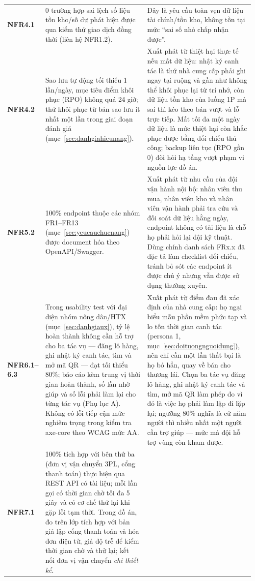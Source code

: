 \begin{longtable}{L{1.67cm} L{6.67cm} L{6.56cm}}
\textbf{NFR4.1} &
0 trường hợp sai lệch số liệu tồn kho/số dư phát hiện được qua kiểm thử giao dịch đồng thời (liên hệ NFR1.2). &
Đây là yêu cầu toàn vẹn dữ liệu tài chính/tồn kho, không tồn tại mức ``sai số nhỏ chấp nhận được''. \\
\textbf{NFR4.2} &
Sao lưu tự động tối thiểu 1 lần/ngày, mục tiêu điểm khôi phục (RPO) không quá 24 giờ; thử khôi phục từ bản sao lưu ít nhất một lần trong giai đoạn đánh giá (mục~\ref{sec:danhgiahieunang}). &
Xuất phát từ thiệt hại thực tế nếu mất dữ liệu: nhật ký canh tác là thứ nhà cung cấp phải ghi ngay tại ruộng và gần như không thể khôi phục lại từ trí nhớ, còn dữ liệu tồn kho của luồng 1P mà sai thì kéo theo bán vượt và lỗ trực tiếp. Mất tối đa một ngày dữ liệu là mức thiệt hại còn khắc phục được bằng đối chiếu thủ công; backup liên tục (RPO gần 0) đòi hỏi hạ tầng vượt phạm vi nguồn lực đồ án. \\
\textbf{NFR5.2} &
100\% endpoint thuộc các nhóm FR1--FR13 (mục~\ref{sec:yeucauchucnang}) được document hóa theo OpenAPI/Swagger. &
Xuất phát từ nhu cầu của đội vận hành nội bộ: nhân viên thu mua, nhân viên kho và nhân viên vận hành phải tra cứu và đối soát dữ liệu hằng ngày, endpoint không có tài liệu là chỗ họ phải hỏi lại đội kỹ thuật. Dùng chính danh sách FRx.x đã đặc tả làm checklist đối chiếu, tránh bỏ sót các endpoint ít được chú ý nhưng vẫn được sử dụng thường xuyên. \\
\textbf{NFR6.1--6.3} &
Trong usability test với đại diện nhóm nông dân/HTX (mục~\ref{sec:danhgiaux}), tỷ lệ hoàn thành không cần hỗ trợ cho ba tác vụ --- đăng lô hàng, ghi nhật ký canh tác, tìm và mở mã QR --- đạt tối thiểu 80\%; báo cáo kèm trung vị thời gian hoàn thành, số lần nhờ giúp và số lỗi phải làm lại cho từng tác vụ (Phụ lục A). Không có lỗi tiếp cận mức nghiêm trọng trong kiểm tra axe-core theo WCAG mức AA. &
Xuất phát từ điểm đau đã xác định của nhà cung cấp: họ ngại biểu mẫu phần mềm phức tạp và lo tốn thời gian canh tác (persona 1, mục~\ref{sec:doituongnguoidung}), nên chỉ cần một lần thất bại là họ bỏ hẳn, quay về bán cho thương lái. Chọn ba tác vụ đăng lô hàng, ghi nhật ký canh tác và tìm, mở mã QR làm phép đo vì đó là việc họ phải làm lặp đi lặp lại; ngưỡng 80\% nghĩa là cứ năm người thì nhiều nhất một người cần trợ giúp --- mức mà đội hỗ trợ vùng còn kham được. \\
\textbf{NFR7.1} &
100\% tích hợp với bên thứ ba (đơn vị vận chuyển 3PL, cổng thanh toán) thực hiện qua REST API có tài liệu; mỗi lần gọi có thời gian chờ tối đa 5 giây và có cơ chế thử lại khi gặp lỗi tạm thời. Trong đồ án, đo trên lớp tích hợp với bản giả lập cổng thanh toán và hóa đơn điện tử, giả độ trễ để kiểm thời gian chờ và thử lại; kết nối đơn vị vận chuyển \emph{chỉ thiết kế}. &

\end{longtable}
